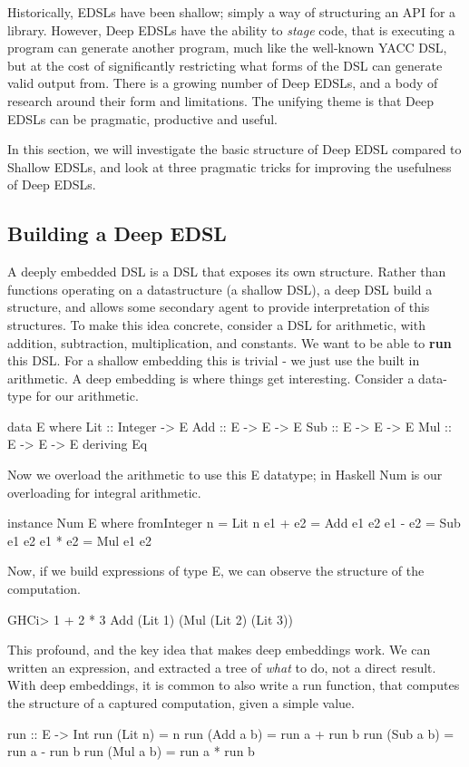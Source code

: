 \documentclass[11pt]{article}
\begin{document}
Historically, EDSLs have been shallow; simply a way of structuring an API for a library. 
However, Deep EDSLs have the ability to {\em stage\/} code, that is executing a program
can generate another program, much like the well-known YACC DSL,
but at the cost of significantly restricting what forms of the DSL can
generate valid output from.
There is a growing number of Deep EDSLs, and a body of research around their
form and limitations.
The unifying theme is that Deep EDSLs can be pragmatic, productive and useful.

In this section, we will investigate the basic structure of Deep EDSL compared to Shallow EDSLs,
and look at three pragmatic tricks for improving the usefulness of Deep EDSLs.

\subsection{Building a Deep EDSL}

A deeply embedded DSL is a DSL that exposes its own structure.
Rather than functions operating on a datastructure (a shallow DSL),
a deep DSL build a structure, and allows some secondary agent to
provide interpretation of this structures.
To make this idea concrete, consider a DSL for arithmetic,
with addition, subtraction, multiplication, and constants.
We want to be able to {\bf run\/} this DSL. For a shallow
embedding this is trivial - we just use the built in 
arithmetic. A deep embedding is where things get
interesting. Consider a data-type for our arithmetic.

\begin{Code}
data E where
 Lit :: Integer -> E
 Add :: E -> E -> E
 Sub :: E -> E -> E
 Mul :: E -> E -> E
 deriving Eq
\end{Code}

Now we overload the arithmetic to use this E datatype;
in Haskell Num is our overloading for integral arithmetic.

\begin{Code}
instance Num E where
  fromInteger n = Lit n
  e1 + e2 = Add e1 e2
  e1 - e2 = Sub e1 e2
  e1 * e2 = Mul e1 e2
\end{Code}

Now, if we build expressions of type E, we can
observe the structure of the computation.
\begin{Code}
GHCi> 1 + 2 * 3
Add (Lit 1) (Mul (Lit 2) (Lit 3))
\end{Code}

This profound, and the key idea that makes deep embeddings work. We can written
an expression, and extracted a tree of {\em what\/} to do, not a direct result.
With deep embeddings, it is common to also
write a run function, that computes the structure
of a captured computation, given a simple value.
\begin{Code}
run :: E -> Int
run (Lit n)   = n
run (Add a b) = run a + run b
run (Sub a b) = run a - run b
run (Mul a b) = run a * run b
\end{Code}
\end{document}
